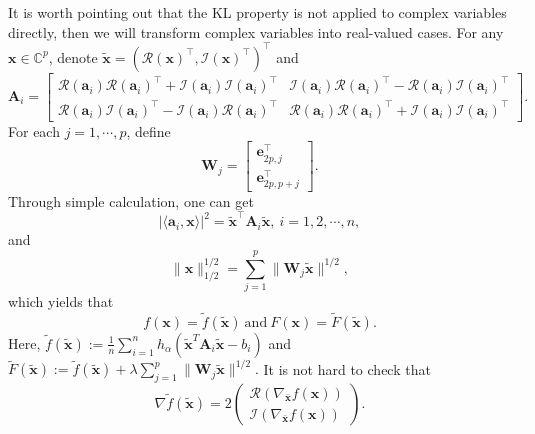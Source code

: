 \documentclass{article}
\numberwithin{equation}{section}
\begin{document}
It is worth pointing out that the KL property is not applied to complex variables directly, then we will transform complex variables into real-valued cases. For any $\mathbf{x}\in \mathbb{C}^p$, denote $\tilde{\mathbf{x}}=( \mathcal{R}(\mathbf{x})^\top, \mathcal{I}(\mathbf{x})^\top)^\top $ and 
\begin{equation}
\mathbf{A}_i=\begin{bmatrix} \mathcal{R}(\mathbf{a}_i)\mathcal{R}(\mathbf{a}_i)^\top+\mathcal{I}(\mathbf{a}_i)\mathcal{I}(\mathbf{a}_i)^\top & \mathcal{I}(\mathbf{a}_i)\mathcal{R}(\mathbf{a}_i)^\top-\mathcal{R}(\mathbf{a}_i)\mathcal{I}(\mathbf{a}_i)^\top \\
\mathcal{R}(\mathbf{a}_i)\mathcal{I}(\mathbf{a}_i)^\top-\mathcal{I}(\mathbf{a}_i)\mathcal{R}(\mathbf{a}_i)^\top & \mathcal{R}(\mathbf{a}_i)\mathcal{R}(\mathbf{a}_i)^\top+\mathcal{I}(\mathbf{a}_i)\mathcal{I}(\mathbf{a}_i)^\top \end{bmatrix}.\nonumber
\end{equation}
For each $j=1,\cdots,p$, define
\begin{equation}
	\mathbf{W}_j=
	\begin{bmatrix} \mathbf{e}_{2p,j}^\top \\
		\mathbf{e}_{2p,p+j}^\top \end{bmatrix}.\nonumber
\end{equation}
Through simple calculation, one can get
\begin{equation}
|\langle \mathbf{a}_i,\mathbf{x}\rangle|^2=\tilde{\mathbf{x}}^\top \mathbf{A}_i\tilde{\mathbf{x}},~i=1,2,\cdots,n,\nonumber
\end{equation}
and
$$\|\mathbf{x}\|_{1/2}^{1/2}=\sum_{j=1}^p\|\mathbf{W}_j\tilde{\mathbf{x}}\|^{1/2},$$
which yields that
\begin{equation}
	f(\mathbf{x})=\tilde{f}(\tilde{\mathbf{x}})~\mbox{and}~ F(\mathbf{x})=\tilde{F}(\tilde{\mathbf{x}}).\nonumber
\end{equation}
Here, $\tilde{f}(\tilde{\mathbf{x}}):=\frac{1}{n}\sum_{i=1}^nh_{\alpha}(\tilde{\mathbf{x}}^T\mathbf{A}_i\tilde{\mathbf{x}}-b_i)$  and $\tilde{F}(\tilde{\mathbf{x}}):=\tilde{f}(\tilde{\mathbf{x}})+\lambda\sum_{j=1}^p\|\mathbf{W}_j\tilde{\mathbf{x}}\|^{1/2}.$
It is not hard to check that
\begin{equation}
\nabla\tilde{f}(\tilde{\mathbf{x}}) = 2
\begin{pmatrix} \mathcal{R}(\nabla_{\bar{\mathbf{x}}}f(\mathbf{x})) \\
\mathcal{I}(\nabla_{\bar{\mathbf{x}}}f(\mathbf{x})) \end{pmatrix}.\nonumber
\end{equation}
\end{document}
